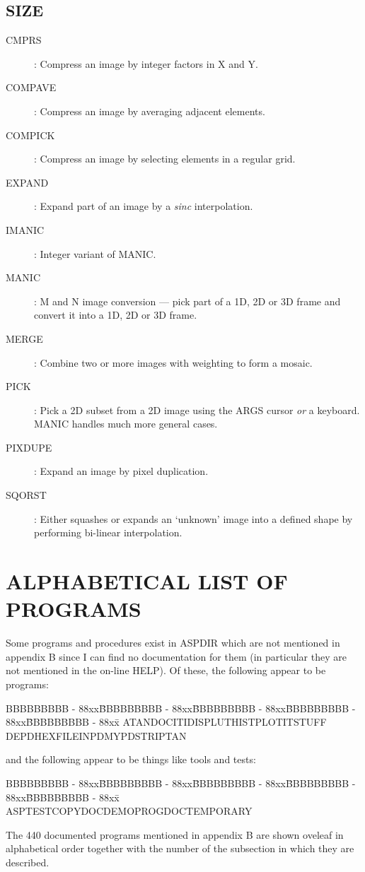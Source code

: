 \subsection {SIZE}
\begin{description}
\item [CMPRS]: Compress an image by integer factors in X and Y.
\item [COMPAVE]: Compress an image by averaging adjacent elements.
\item [COMPICK]: Compress an image by selecting elements in a regular grid.
\item [EXPAND]: Expand part of an image by a {\em sinc} interpolation.
\item [IMANIC]: Integer variant of MANIC.
\item [MANIC]: M and N image conversion --- pick part of a 1D, 2D or 3D frame
and convert it into a 1D, 2D or 3D frame.
\item [MERGE]: Combine two or more images with weighting to form a mosaic.
\item [PICK]: Pick a 2D subset from a 2D image using the ARGS cursor {\em or} a
keyboard.
MANIC handles much more general cases.
\item [PIXDUPE]: Expand an image by pixel duplication.
\item [SQORST]: Either squashes or expands an `unknown' image into a defined
shape by performing bi-linear interpolation.
\end{description}
\newpage

\section {ALPHABETICAL LIST OF PROGRAMS}

Some programs and procedures exist in ASPDIR which are not mentioned in appendix
B since I can find no documentation for them (in particular they are not
mentioned in the on-line HELP).
Of these, the following appear to be programs:\\
\vspace{20mm}
{\scriptsize
\begin{tabbing}
BBBBBBBBB - 88xx\=BBBBBBBBB - 88xx\=BBBBBBBBB - 88xx\=BBBBBBBBB - 88xx\=BBBBBBBBB - 88xx\=\kill
ATAN\>DOCIT\>IDISP\>LUTHIST\>PLOTIT\>STUFF\\
DEPD\>HEXFILE\>INPD\>MYPD\>STRIP\>TAN
\end{tabbing}}
\vspace{20mm}
and the following appear to be things like tools and tests:\\
\vspace{20mm}
{\scriptsize
\begin{tabbing}
BBBBBBBBB - 88xx\=BBBBBBBBB - 88xx\=BBBBBBBBB - 88xx\=BBBBBBBBB - 88xx\=BBBBBBBBB - 88xx\=\kill
ASPTEST\>COPYDOC\>DEMO\>PROGDOC\>TEMPORARY
\end{tabbing}}
\vspace{20mm}
The 440 documented programs mentioned in appendix B are shown oveleaf in
alphabetical order together with the number of the subsection in which they are
described.

